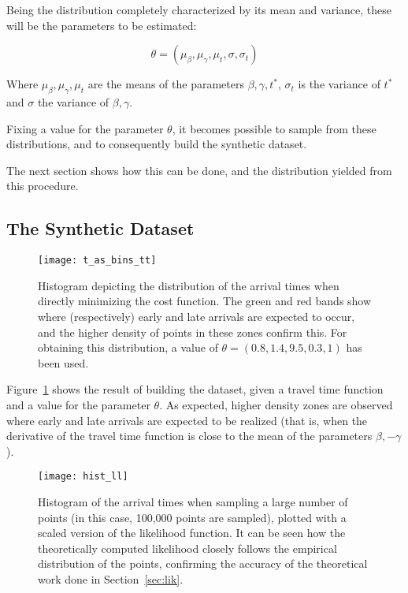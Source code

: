 Being the distribution completely characterized by its mean and variance,
these will be the parameters to be estimated:

\begin{equation}
  \label{eq:theta_def}
  \theta = (\mu_\beta, \mu_\gamma, \mu_t, \sigma, \sigma_t)
\end{equation}

Where \(\mu_\beta, \mu_\gamma, \mu_t\) are the means of the parameters \(\beta, \gamma, t^*\),
\(\sigma_t\) is the variance of \(t^*\) and \(\sigma\) the variance of \(\beta, \gamma\).

Fixing a value for the parameter \(\theta\),
it becomes possible to sample from these distributions,
and to consequently build the synthetic dataset.

The next section shows how this can be done, and the distribution yielded from this procedure.

\subsection{The Synthetic Dataset}


\begin{figure}
  \centering
  \texttt{[image: t\_as\_bins\_tt]}
  \caption{Histogram depicting the distribution of the arrival times when directly minimizing the cost function.
    The green and red bands show where (respectively) early and late arrivals are expected to occur,
    and the higher density of points in these zones confirm this.
  For obtaining this distribution, a value of \(\theta = (0.8, 1.4, 9.5, 0.3, 1)\) has been used.}
  \label{fig:t_as}
\end{figure}

Figure~\ref{fig:t_as} shows the result of building the dataset, given a travel time function and a value for the parameter \(\theta\).
As expected, higher density zones are observed where early and late arrivals are expected to be realized
(that is, when the derivative of the travel time function is close to the mean of the parameters \(\beta, -\gamma\)).

\begin{figure}
  \centering
  \texttt{[image: hist\_ll]}
  \caption{Histogram of the arrival times when sampling a large number of points (in this case, 100,000 points are sampled),
    plotted with a scaled version of the likelihood function.
    It can be seen how the theoretically computed likelihood closely follows the empirical distribution of the points,
    confirming the accuracy of the theoretical work done in Section~\ref{sec:lik}.}
  \label{fig:hist_pdf}
\end{figure}

